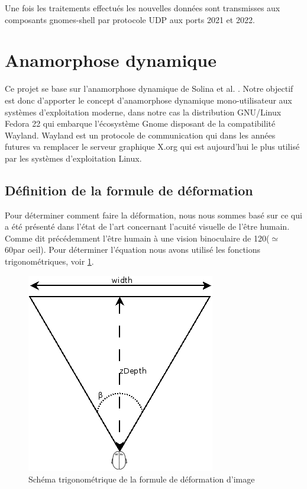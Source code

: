 Une fois les traitements effectués les nouvelles données sont transmisses aux composants gnomes-shell par protocole UDP aux ports 2021 et 2022. 





















\section{Anamorphose dynamique}

Ce projet se base sur l’anamorphose dynamique de Solina et al. \cite{Schmidt:2013:SEP:2470654.2466227}. Notre objectif est donc d'apporter le concept d'anamorphose dynamique mono-utilisateur aux systèmes d'exploitation moderne, dans notre cas la distribution GNU/Linux Fedora 22 qui embarque l'écosystème Gnome disposant de la compatibilité Wayland. Wayland est un protocole de communication qui dans les années futures va remplacer le serveur graphique X.org qui est aujourd'hui le plus utilisé par les systèmes d'exploitation Linux.

\subsection{Définition de la formule de déformation}


Pour déterminer comment faire la déformation, nous nous sommes basé sur ce qui a été présenté dans l'état de l'art concernant l'acuité visuelle de l'être humain. Comme dit précédemment l'être humain à une vision binoculaire de 120\degres ($\simeq$ 60\degres par oeil). Pour déterminer l'équation nous avons utilisé les fonctions trigonométriques, voir \ref{fig:trigo}.

\begin{figure}[h!]
	\center	
	\includegraphics[scale=0.3]{image/anamorphose_formule.png}
	\caption{Schéma trigonométrique de la formule de déformation d'image}
	\label{fig:trigo}
\end{figure}

